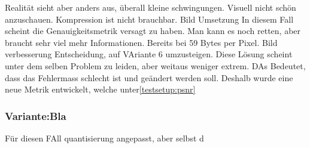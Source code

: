 Realität sieht aber anders aus, überall kleine schwingungen. Visuell nicht schön anzuschauen. Kompression ist nicht brauchbar.
Bild Umsetzung
In diesem Fall scheint die Genauigkeitsmetrik versagt zu haben. Man kann es noch retten, aber braucht sehr viel mehr Informationen. Bereits bei 59 Bytes per Pixel.
Bild verbesserung
Entscheidung, auf VAriante 6 umzusteigen. Diese Lösung scheint unter dem selben Problem zu leiden, aber weitaus weniger extrem. DAs Bedeutet, dass das Fehlermass schlecht ist und geändert werden soll. Deshalb wurde eine neue Metrik entwickelt, welche unter\ref{testsetup:psnr}


\subsubsection{Variante:Bla}
Für diesen FAll quantisierung angepasst, aber selbst d
